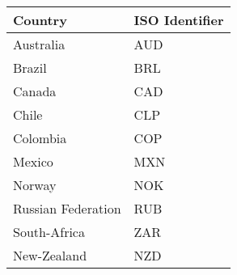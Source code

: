 \begin{tabular}{ll}
\toprule
Country &  ISO Identifier\\
\midrule
Australia    &   AUD\\
Brazil   &   BRL \\
Canada     &  CAD \\
Chile    &   CLP \\
Colombia   &  COP \\
Mexico  &  MXN \\
Norway  &  NOK \\
Russian Federation & RUB\\
South-Africa     &  ZAR \\
New-Zealand & NZD \\
\bottomrule
\end{tabular}
